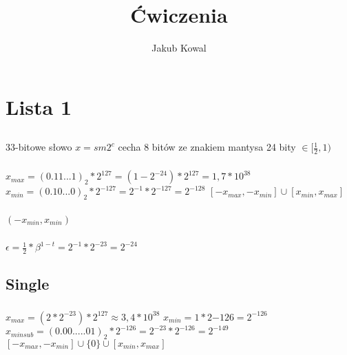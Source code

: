 \documentclass{article}
\title{Ćwiczenia}
\author{Jakub Kowal}
\begin{document}
\maketitle
\renewcommand{\thesubsubsection}{\thesubsection.\alph{subsubsection})}

    \section{Lista 1}
    \setcounter{subsection}{4}
    \subsection{}
    33-bitowe słowo $x=sm2^{c}$\newline
    cecha 8 bitów ze znakiem\newline
    mantysa 24 bity $\in [\frac{1}{2},1)$\newline
    
    \subsubsection{}
    $x_{max}=(0.11...1)_{2}*2^{127}=(1-2^{-24})*2^{127}=1,7*10^{38}$\newline
    $x_{min}=(0.10...0)_{2}*2^{-127}=2^{-1}*2^{-127}=2^{-128}$\newline
    $[-x_{max},-x_{min}]\cup[x_{min},x_{max}]$\newline
    
    \subsubsection{}
    $(-x_{min},x_{min})$\newline
    
    \subsubsection{}
    $\epsilon=\frac{1}{2}*\beta^{1-t}=2^{-1}*2^{-23}=2^{-24}$
    
    \subsection*{Single}
    \setcounter{subsubsection}{0}
    \subsubsection{}
    $x_{max}=(2*2^{-23})*2^{127}\approx3,4*10^{38}$\newline
    $x_{min}=1*2{-126}=2^{-126}$\newline
    $x_{minsub}=(0.00.....01)_{2}*2^{-126}=2^{-23}*2^{-126}=2^{-149}$\newline
    $[-x_{max},-x_{min}]\cup\{0\}\cup[x_{min},x_{max}]$\newline
    
\end{document}
